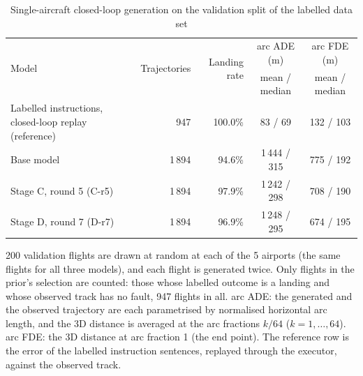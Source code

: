 
\begin{table}[htbp]
  \centering
  \caption{Single-aircraft closed-loop generation on the validation split of the labelled data set}
  \label{tab:two_tier_val_single}
  \begin{tabular}{lrrcc}
    \toprule
    \multirow{2}{*}{Model} & \multirow{2}{*}{Trajectories} & \multirow{2}{*}{Landing rate} & arc ADE (m) & arc FDE (m) \\
     & & & mean / median & mean / median \\
    \midrule
    Labelled instructions, closed-loop replay (reference) & 947   & 100.0\% & 83 / 69      & 132 / 103 \\
    \midrule
    Base model                                            & 1\,894 & 94.6\%  & 1\,444 / 315 & 775 / 192 \\
    Stage C, round 5 (C-r5)                               & 1\,894 & 97.9\%  & 1\,242 / 298 & 708 / 190 \\
    Stage D, round 7 (D-r7)                               & 1\,894 & 96.9\%  & 1\,248 / 295 & 674 / 195 \\
    \bottomrule
  \end{tabular}
  \par\smallskip
  \parbox{0.95\linewidth}{\footnotesize
    200 validation flights are drawn at random at each of the 5 airports (the same flights for all three models), and
    each flight is generated twice. Only flights in the prior's selection are counted: those whose labelled outcome is a
    landing and whose observed track has no fault, 947 flights in all. arc ADE: the generated and the observed
    trajectory are each parametrised by normalised horizontal arc length, and the 3D distance is averaged at the arc
    fractions $k/64$ ($k=1,\dots,64$). arc FDE: the 3D distance at arc fraction 1 (the end point). The reference row is
    the error of the labelled instruction sentences, replayed through the executor, against the observed track.}
\end{table}

